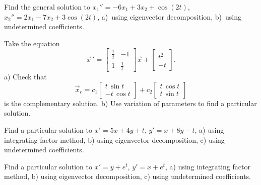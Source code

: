 \documentclass[12pt]{book}
\begin{document}
\begin{exercise}
Find the general solution to
$x_1'' = -6x_1+ 3x_2 + \cos (2t)$, 
$x_2'' = 2x_1 -7x_2 + 3\cos (2t)$,
a)~using eigenvector decomposition,
b)~using undetermined coefficients.
\end{exercise}

\begin{exercise}
Take the equation
\begin{equation*}
{\vec{x}\,}'
=
\begin{bmatrix}
\frac{1}{t} & -1 \\
1 & \frac{1}{t}
\end{bmatrix}
\vec{x}
+ \begin{bmatrix} t^2 \\ -t \end{bmatrix} .
\end{equation*}
a) Check that
\begin{equation*}
\vec{x}_c =
c_1
\begin{bmatrix}
t\, \sin t \\
- t \, \cos t
\end{bmatrix}
+
c_2
\begin{bmatrix}
t\, \cos t \\
t \, \sin t
\end{bmatrix}
\end{equation*}
is the complementary solution.
b) Use variation of parameters to
find a particular solution.
\end{exercise}

\setcounter{exercise}{100}

\begin{exercise}
Find a particular solution to $x' = 5x + 4y + t$, $y' = x + 8y - t$, a) using integrating
factor method, b) using eigenvector decomposition, c) using undetermined coefficients.
\end{exercise}

\begin{exercise}
Find a particular solution to $x' = y + e^t$, $y' = x +e^t$, a) using integrating
factor method, b) using eigenvector decomposition, c) using undetermined coefficients.
\end{exercise}
\end{document}
